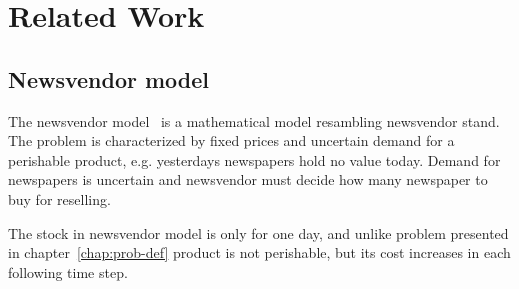 
\chapter{Related Work}
\label{chap:Related Work}

\section{Newsvendor model}
\label{sec:Newsvendor model}

The newsvendor model~\autocite{Arrow1974} is a mathematical model resambling newsvendor stand. The problem is characterized by fixed prices and uncertain demand for a perishable product, e.g. yesterdays newspapers hold no value today. Demand for newspapers is uncertain and newsvendor must decide how many newspaper to buy for reselling.

The stock in newsvendor model is only for one day, and unlike problem presented in chapter~\ref{chap:prob-def} product is not perishable, but its cost increases in each following time step.
